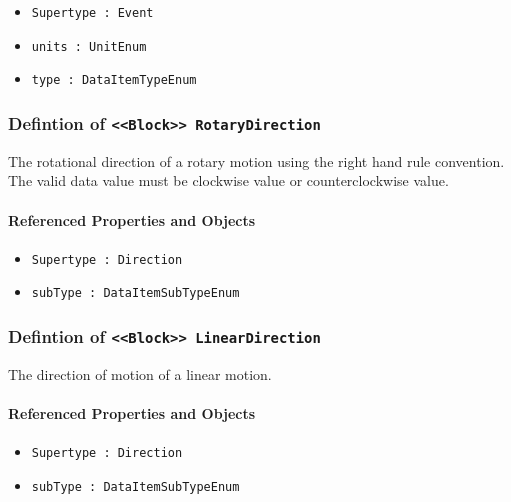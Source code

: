 \begin{itemize}
\item \texttt{Supertype : Event}

\item \texttt{units : UnitEnum}

\item \texttt{type : DataItemTypeEnum}

\end{itemize}
\FloatBarrier
\subsubsection{Defintion of \texttt{<<Block>> RotaryDirection}}
  \label{type:RotaryDirection}

\FloatBarrier

The rotational direction of a rotary motion using the right hand rule convention.
 The valid data value must be clockwise value or counterclockwise value.

\FloatBarrier
\paragraph{Referenced Properties and Objects}

\begin{itemize}
\item \texttt{Supertype : Direction}

\item \texttt{subType : DataItemSubTypeEnum}

\end{itemize}
\FloatBarrier
\subsubsection{Defintion of \texttt{<<Block>> LinearDirection}}
  \label{type:LinearDirection}

\FloatBarrier

The direction of motion of a linear motion.

\FloatBarrier
\paragraph{Referenced Properties and Objects}

\begin{itemize}
\item \texttt{Supertype : Direction}

\item \texttt{subType : DataItemSubTypeEnum}

\end{itemize}
\FloatBarrier
